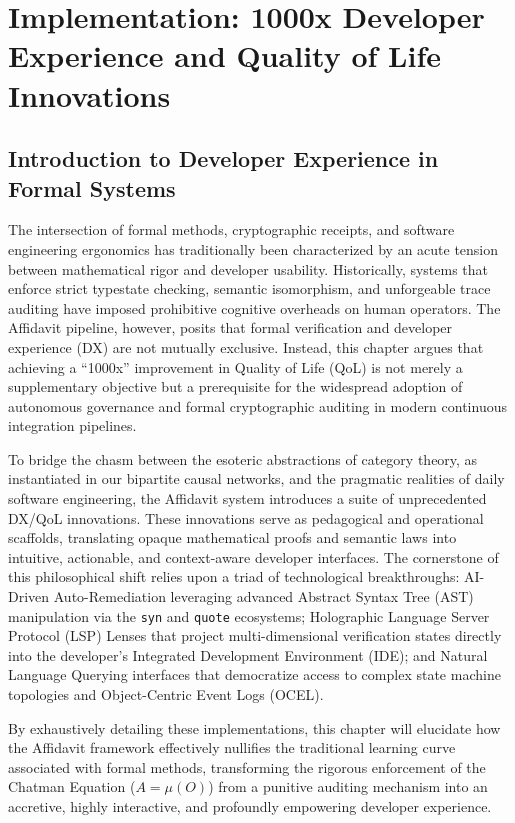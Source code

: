 \chapter{Implementation: 1000x Developer Experience and Quality of Life Innovations}
\label{chap:impl_qol}

\section{Introduction to Developer Experience in Formal Systems}
\label{sec:qol_introduction}

The intersection of formal methods, cryptographic receipts, and software engineering ergonomics has traditionally been characterized by an acute tension between mathematical rigor and developer usability. Historically, systems that enforce strict typestate checking, semantic isomorphism, and unforgeable trace auditing have imposed prohibitive cognitive overheads on human operators. The Affidavit pipeline, however, posits that formal verification and developer experience (DX) are not mutually exclusive. Instead, this chapter argues that achieving a ``1000x'' improvement in Quality of Life (QoL) is not merely a supplementary objective but a prerequisite for the widespread adoption of autonomous governance and formal cryptographic auditing in modern continuous integration pipelines. 

To bridge the chasm between the esoteric abstractions of category theory, as instantiated in our bipartite causal networks, and the pragmatic realities of daily software engineering, the Affidavit system introduces a suite of unprecedented DX/QoL innovations. These innovations serve as pedagogical and operational scaffolds, translating opaque mathematical proofs and semantic laws into intuitive, actionable, and context-aware developer interfaces. The cornerstone of this philosophical shift relies upon a triad of technological breakthroughs: AI-Driven Auto-Remediation leveraging advanced Abstract Syntax Tree (AST) manipulation via the \texttt{syn} and \texttt{quote} ecosystems; Holographic Language Server Protocol (LSP) Lenses that project multi-dimensional verification states directly into the developer's Integrated Development Environment (IDE); and Natural Language Querying interfaces that democratize access to complex state machine topologies and Object-Centric Event Logs (OCEL). 

By exhaustively detailing these implementations, this chapter will elucidate how the Affidavit framework effectively nullifies the traditional learning curve associated with formal methods, transforming the rigorous enforcement of the Chatman Equation ($A = \mu(O)$) from a punitive auditing mechanism into an accretive, highly interactive, and profoundly empowering developer experience. 

